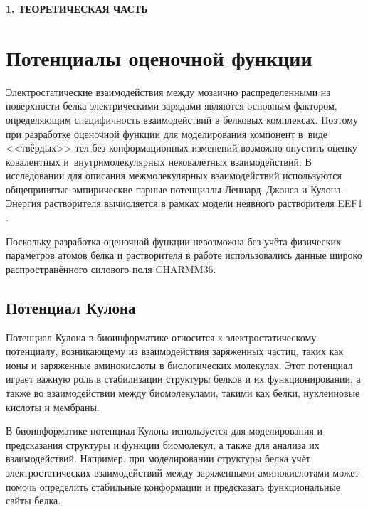 \newpage
\begin{center}
  \textbf{\large 1. ТЕОРЕТИЧЕСКАЯ ЧАСТЬ}
\end{center}


\section{Потенциалы оценочной функции}

Электростатические взаимодействия между мозаично распределенными на поверхности белка электрическими зарядами являются основным фактором, определяющим специфичность взаимодействий в белковых комплексах\cite{chrushev}. Поэтому при разработке оценочной функции для моделирования компонент в~виде <<твёрдых>> тел без конформационных изменений возможно опустить оценку ковалентных и~внутримолекулярных нековалетных взаимодействий. В исследовании для описания межмолекулярных взаимодействий используются общепринятые эмпирические парные потенциалы Леннард--Джонса и Кулона. Энергия растворителя вычисляется в рамках модели неявного растворителя EEF1 \cite{eef1}.

Поскольку разработка оценочной функции невозможна без учёта физических параметров атомов белка и растворителя в работе использовались данные широко распространённого силового поля CHARMM36\cite{brooks}.


\subsection{Потенциал Кулона}


Потенциал Кулона в биоинформатике относится к электростатическому потенциалу, возникающему из взаимодействия заряженных частиц, таких как ионы и заряженные аминокислоты в биологических молекулах. Этот потенциал играет важную роль в стабилизации структуры белков и их функционировании, а также во взаимодействии между биомолекулами, такими как белки, нуклеиновые кислоты и мембраны.

В биоинформатике потенциал Кулона используется для моделирования и предсказания структуры и функции биомолекул, а также для анализа их взаимодействий. Например, при моделировании структуры белка учёт электростатических взаимодействий между заряженными аминокислотами может помочь определить стабильные конформации и предсказать функциональные сайты белка.

